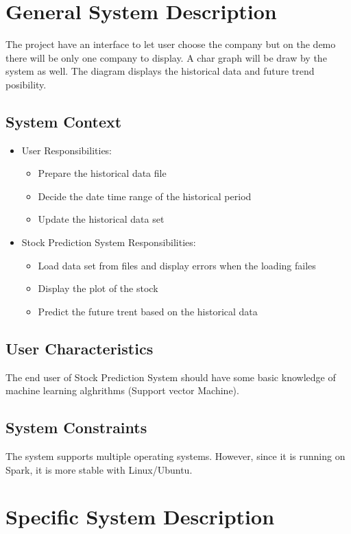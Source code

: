 \documentclass[12pt]{article}
\newcommand{\progname}{Stock Prediction System} %
\begin{document}
\section{General System Description}

The project have an interface to let user choose the company but on the demo there will be only one company to display. A char graph will be draw by the system as well. The diagram displays the historical data and future trend posibility. 

\subsection{System Context}

\begin{itemize}
\item User Responsibilities:
\begin{itemize}
\item Prepare the historical data file
\item Decide the date time range of the historical period
\item Update the historical data set
\end{itemize}
\item \progname{} Responsibilities:
\begin{itemize}
\item Load data set from files and display errors when the loading failes
\item Display the plot of the stock
\item Predict the future trent based on the historical data
\end{itemize}
\end{itemize}

\subsection{User Characteristics} \label{SecUserCharacteristics}

The end user of \progname{} should have some basic knowledge of machine learning alghrithms (Support vector Machine).

\subsection{System Constraints}
The system supports multiple operating systems. However, since it is running on Spark, it is more stable with Linux/Ubuntu.

\section{Specific System Description}
\end{document}
